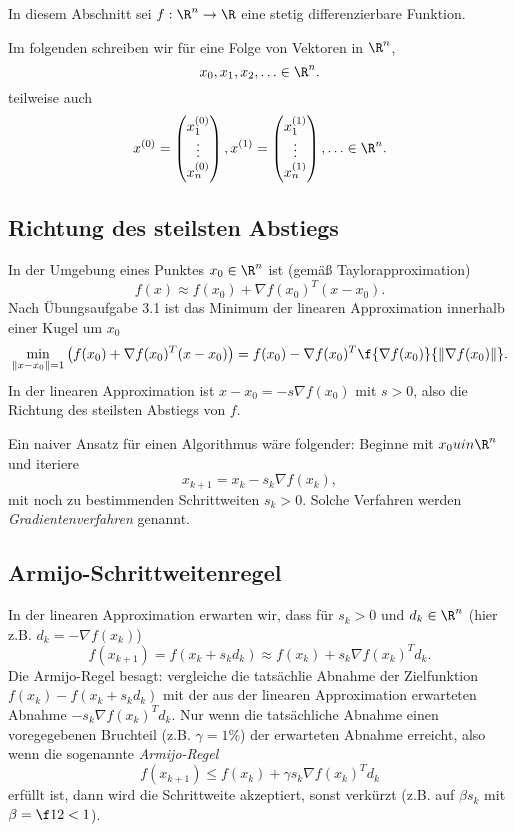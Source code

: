 In diesem Abschnitt sei $f: \R^n \to \R$ eine stetig differenzierbare Funktion.

\begin{conv*}
	Im folgenden schreiben wir für eine Folge von Vektoren in $\R^n$,
	\[
		x_0, x_1, x_2, \dotsc \in \R^n.
	\]
	teilweise auch
	\[
		x^{(0)} = \begin{pmatrix}
			x_1^{(0)} \\ \vdots \\ x_n^{(0)}
		\end{pmatrix},
		x^{(1)} = \begin{pmatrix}
			x_1^{(1)} \\ \vdots \\ x_n^{(1)}
		\end{pmatrix},
		\dotsc \in \R^n.
	\]
\end{conv*}

\subsection{Richtung des steilsten Abstiegs}

In der Umgebung eines Punktes $x_0 \in \R^n$ ist (gemäß Taylorapproximation)
\[
	f(x) \approx f(x_0) + \nabla f(x_0)^T (x-x_0).
\]
Nach Übungsaufgabe 3.1 %
ist das Minimum der linearen Approximation innerhalb einer Kugel um $x_0$
\[
	\min_{\|x-x_0\|=1} \big( f(x_0) + \nabla f(x_0)^T (x-x_0) \big)
	= f(x_0) - \nabla f(x_0)^T \f {\nabla f(x_0)}{\|\nabla f(x_0)\|}.
\]
In der linearen Approximation ist $x-x_0 = -s \nabla f(x_0)$ mit $s > 0$, also die Richtung des steilsten Abstiegs von $f$.

Ein naiver Ansatz für einen Algorithmus wäre folgender:
Beginne mit $x_0 uin \R^n$ und iteriere
\[
	x_{k+1} = x_k - s_k \nabla f(x_k),
\]
mit noch zu bestimmenden Schrittweiten $s_k > 0$.
Solche Verfahren werden \emph{Gradientenverfahren} genannt.

\subsection{Armijo-Schrittweitenregel}

In der linearen Approximation erwarten wir, dass für $s_k > 0$ und $d_k \in \R^n$ (hier z.B. $d_k = -\nabla f(x_k)$)
\[
	f(x_{k+1})
	= f(x_k + s_k d_k)
	\approx f(x_k) + s_k \nabla f(x_k)^T d_k.
\]
Die Armijo-Regel besagt:
vergleiche die tatsächlie Abnahme der Zielfunktion $f(x_k) - f(x_k + s_kd_k)$ mit der aus der linearen Approximation erwarteten Abnahme $-s_k \nabla f(x_k)^T d_k$.
Nur wenn die tatsächliche Abnahme einen voregegebenen Bruchteil (z.B. $\gamma = 1\%$) der erwarteten Abnahme erreicht, also wenn die sogenannte \emph{Armijo-Regel}
\[
	f(x_{k+1})
	\le f(x_k) + \gamma s_k \nabla f(x_k)^T d_k
\]
erfüllt ist, dann wird die Schrittweite akzeptiert, sonst verkürzt (z.B. auf $\beta s_k$ mit $\beta = \f 12 < 1$).

